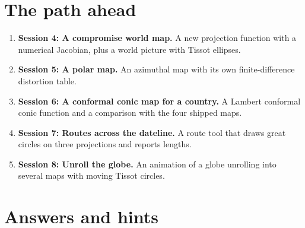 \documentclass[11pt,a4paper]{article}
\begin{document}
\section{The path ahead}
\begin{enumerate}[nosep]
\item \textbf{Session 4: A compromise world map.} A new projection function with a numerical Jacobian, plus a world picture with Tissot ellipses.
\item \textbf{Session 5: A polar map.} An azimuthal map with its own finite-difference distortion table.
\item \textbf{Session 6: A conformal conic map for a country.} A Lambert conformal conic function and a comparison with the four shipped maps.
\item \textbf{Session 7: Routes across the dateline.} A route tool that draws great circles on three projections and reports lengths.
\item \textbf{Session 8: Unroll the globe.} An animation of a globe unrolling into several maps with moving Tissot circles.
\end{enumerate}

\section{Answers and hints}
\end{document}
